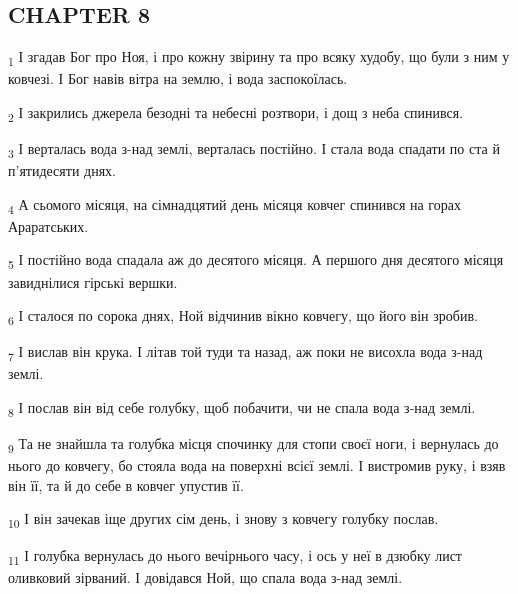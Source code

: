 \subsection{CHAPTER 8}
\begin{tcolorbox}
\textsubscript{1} І згадав Бог про Ноя, і про кожну звірину та про всяку худобу, що були з ним у ковчезі. І Бог навів вітра на землю, і вода заспокоїлась.
\end{tcolorbox}
\begin{tcolorbox}
\textsubscript{2} І закрились джерела безодні та небесні розтвори, і дощ з неба спинився.
\end{tcolorbox}
\begin{tcolorbox}
\textsubscript{3} І верталась вода з-над землі, верталась постійно. І стала вода спадати по ста й п'ятидесяти днях.
\end{tcolorbox}
\begin{tcolorbox}
\textsubscript{4} А сьомого місяця, на сімнадцятий день місяця ковчег спинився на горах Араратських.
\end{tcolorbox}
\begin{tcolorbox}
\textsubscript{5} І постійно вода спадала аж до десятого місяця. А першого дня десятого місяця завиднілися гірські вершки.
\end{tcolorbox}
\begin{tcolorbox}
\textsubscript{6} І сталося по сорока днях, Ной відчинив вікно ковчегу, що його він зробив.
\end{tcolorbox}
\begin{tcolorbox}
\textsubscript{7} І вислав він крука. І літав той туди та назад, аж поки не висохла вода з-над землі.
\end{tcolorbox}
\begin{tcolorbox}
\textsubscript{8} І послав він від себе голубку, щоб побачити, чи не спала вода з-над землі.
\end{tcolorbox}
\begin{tcolorbox}
\textsubscript{9} Та не знайшла та голубка місця спочинку для стопи своєї ноги, і вернулась до нього до ковчегу, бо стояла вода на поверхні всієї землі. І вистромив руку, і взяв він її, та й до себе в ковчег упустив її.
\end{tcolorbox}
\begin{tcolorbox}
\textsubscript{10} І він зачекав іще других сім день, і знову з ковчегу голубку послав.
\end{tcolorbox}
\begin{tcolorbox}
\textsubscript{11} І голубка вернулась до нього вечірнього часу, і ось у неї в дзюбку лист оливковий зірваний. І довідався Ной, що спала вода з-над землі.
\end{tcolorbox}

